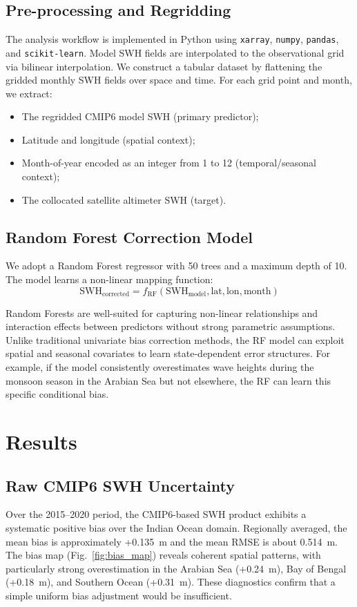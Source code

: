 \documentclass[conference]{IEEEtran}
\begin{document}
\subsection{Pre-processing and Regridding}
The analysis workflow is implemented in Python using \texttt{xarray}, \texttt{numpy}, \texttt{pandas}, and \texttt{scikit-learn}. Model SWH fields are interpolated to the observational grid via bilinear interpolation. We construct a tabular dataset by flattening the gridded monthly SWH fields over space and time. For each grid point and month, we extract:
\begin{itemize}
    \item The regridded CMIP6 model SWH (primary predictor);
    \item Latitude and longitude (spatial context);
    \item Month-of-year encoded as an integer from 1 to 12 (temporal/seasonal context);
    \item The collocated satellite altimeter SWH (target).
\end{itemize}

\subsection{Random Forest Correction Model}
We adopt a Random Forest regressor with 50 trees and a maximum depth of 10. The model learns a non-linear mapping function:
\begin{equation}
\text{SWH}_{\text{corrected}} = f_{\text{RF}}(\text{SWH}_{\text{model}}, \text{lat}, \text{lon}, \text{month})
\end{equation}

Random Forests are well-suited for capturing non-linear relationships and interaction effects between predictors without strong parametric assumptions. Unlike traditional univariate bias correction methods, the RF model can exploit spatial and seasonal covariates to learn state-dependent error structures. For example, if the model consistently overestimates wave heights during the monsoon season in the Arabian Sea but not elsewhere, the RF can learn this specific conditional bias.

\section{Results}

\subsection{Raw CMIP6 SWH Uncertainty}
Over the 2015--2020 period, the CMIP6-based SWH product exhibits a systematic positive bias over the Indian Ocean domain. Regionally averaged, the mean bias is approximately +0.135~m and the mean RMSE is about 0.514~m. The bias map (Fig.~\ref{fig:bias_map}) reveals coherent spatial patterns, with particularly strong overestimation in the Arabian Sea (+0.24~m), Bay of Bengal (+0.18~m), and Southern Ocean (+0.31~m). These diagnostics confirm that a simple uniform bias adjustment would be insufficient.
\end{document}
